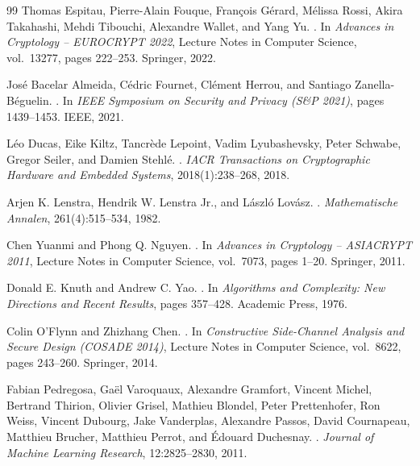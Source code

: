 \documentclass[sigconf,anonymous]{acmart}
\begin{document}
\begin{thebibliography}{99}
Thomas Espitau, Pierre-Alain Fouque, Fran\c{c}ois G\'erard, M\'elissa Rossi,
  Akira Takahashi, Mehdi Tibouchi, Alexandre Wallet, and Yang Yu.
.
\newblock In \emph{Advances in Cryptology -- EUROCRYPT 2022}, Lecture Notes in
  Computer Science, vol.~13277, pages 222--253. Springer, 2022.

Jos\'e Bacelar Almeida, C\'edric Fournet, Cl\'ement Herrou, and Santiago
  Zanella-B\'eguelin.
.
\newblock In \emph{IEEE Symposium on Security and Privacy (S\&P 2021)},
  pages 1439--1453. IEEE, 2021.

L\'eo Ducas, Eike Kiltz, Tancr\`ede Lepoint, Vadim Lyubashevsky, Peter
  Schwabe, Gregor Seiler, and Damien Stehl\'e.
.
\newblock \emph{IACR Transactions on Cryptographic Hardware and Embedded
  Systems}, 2018(1):238--268, 2018.

Arjen K. Lenstra, Hendrik W. Lenstra Jr., and L\'aszl\'o Lov\'asz.
.
\newblock \emph{Mathematische Annalen}, 261(4):515--534, 1982.

Chen Yuanmi and Phong Q. Nguyen.
.
\newblock In \emph{Advances in Cryptology -- ASIACRYPT 2011}, Lecture Notes in
  Computer Science, vol.~7073, pages 1--20. Springer, 2011.

Donald E. Knuth and Andrew C. Yao.
.
\newblock In \emph{Algorithms and Complexity: New Directions and Recent
  Results}, pages 357--428. Academic Press, 1976.

Colin O'Flynn and Zhizhang Chen.
.
\newblock In \emph{Constructive Side-Channel Analysis and Secure Design
  (COSADE 2014)}, Lecture Notes in Computer Science, vol.~8622, pages 243--260.
  Springer, 2014.

Fabian Pedregosa, Ga{\"e}l Varoquaux, Alexandre Gramfort, Vincent Michel,
  Bertrand Thirion, Olivier Grisel, Mathieu Blondel, Peter Prettenhofer,
  Ron Weiss, Vincent Dubourg, Jake Vanderplas, Alexandre Passos, David
  Cournapeau, Matthieu Brucher, Matthieu Perrot, and {\'E}douard Duchesnay.
.
\newblock \emph{Journal of Machine Learning Research}, 12:2825--2830, 2011.


\end{thebibliography}
\end{document}
